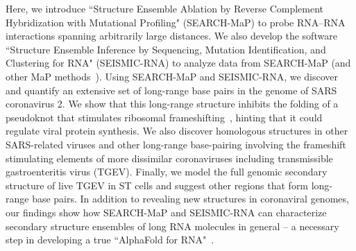 \documentclass[main.tex]{subfiles}
\begin{document}
Here, we introduce ``Structure Ensemble Ablation by Reverse Complement Hybridization with Mutational Profiling" (SEARCH-MaP) to probe RNA--RNA interactions spanning arbitrarily large distances.
We also develop the software ``Structure Ensemble Inference by Sequencing, Mutation Identification, and Clustering for RNA" (SEISMIC-RNA) to analyze data from SEARCH-MaP (and other MaP methods~\cite{Siegfried2014,Zubradt2016}).
Using SEARCH-MaP and SEISMIC-RNA, we discover and quantify an extensive set of long-range base pairs in the genome of SARS coronavirus 2.
We show that this long-range structure inhibits the folding of a pseudoknot that stimulates ribosomal frameshifting~\cite{Kelly2020,KZhang2021}, hinting that it could regulate viral protein synthesis.
We also discover homologous structures in other SARS-related viruses and other long-range base-pairing involving the frameshift stimulating elements of more dissimilar coronaviruses including transmissible gastroenteritis virus (TGEV).
Finally, we model the full genomic secondary structure of live TGEV in ST cells and suggest other regions that form long-range base pairs.
In addition to revealing new structures in coronaviral genomes, our findings show how SEARCH-MaP and SEISMIC-RNA can characterize secondary structure ensembles of long RNA molecules in general -- a necessary step in developing a true ``AlphaFold for RNA"~\cite{Schneider2023}.
\end{document}
